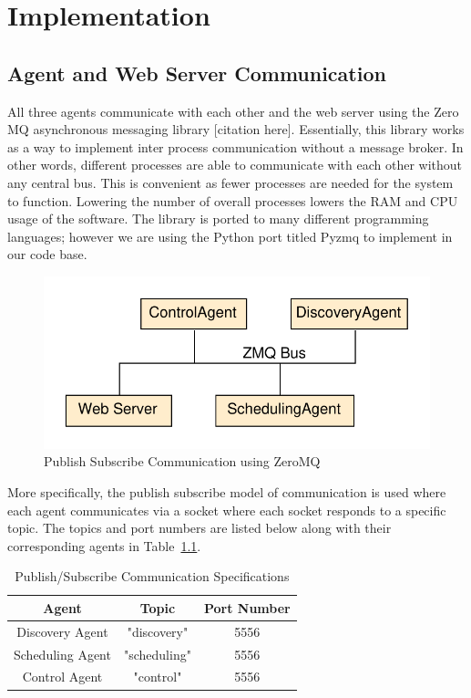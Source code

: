 \chapter{Implementation}
\label{ch: Chapter3}

\section{Agent and Web Server Communication}

All three agents communicate with each other and the web server using the Zero MQ asynchronous messaging library [citation here]. Essentially, this library works as a way to implement inter process communication without a message broker. In other words, different processes are able to communicate with each other without any central bus. This is convenient as fewer processes are needed for the system to function. Lowering the number of overall processes lowers the RAM and CPU usage of the software. The library is ported to many different programming languages; however we are using the Python port titled Pyzmq to implement in our code base. 
\begin{figure}[H]
    \centering
    \includegraphics{figs/pubSubAgents.pdf}
    \caption{Publish Subscribe Communication using ZeroMQ}
    \label{fig:pubSubAgents}
\end{figure}
More specifically, the publish subscribe model of communication is used where each agent communicates via a socket where each socket responds to a specific topic. The topics and port numbers are listed below along with their corresponding agents in Table~\ref{tab:pubsubspecs}.
\begin{table}[H]
    \centering
    \begin{tabular}{|c|c|c|}
        \hline
        Agent & Topic & Port Number\\
        \hline
        Discovery Agent & "discovery" & 5556\\
        Scheduling Agent & "scheduling" & 5556\\
        Control Agent & "control" & 5556\\
        \hline
    \end{tabular}
    \caption{Publish/Subscribe Communication Specifications}
    \label{tab:pubsubspecs}
\end{table}
